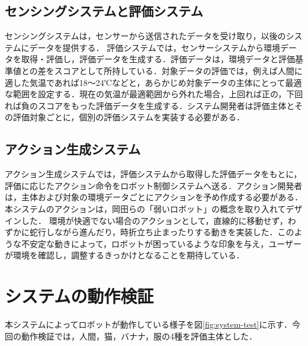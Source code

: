 \documentclass[paper=a4paper,jafontsize=9pt,head_space=15mm,gutter=20mm,
twocolumn,number_of_lines=49, line_length=26zw]{myuarticle}
\begin{document}
\subsection{センシングシステムと評価システム}
センシングシステムは，センサーから送信されたデータを受け取り，以後のシステムにデータを提供する．
評価システムでは，センサーシステムから環境データを取得・評価し，評価データを生成する．評価データは，環境データと評価基準値との差をスコアとして所持している．対象データの評価では，例えば人間に適した気温であれば18～24℃などと，あらかじめ対象データの主体にとって最適な範囲を設定する．現在の気温が最適範囲から外れた場合，上回れば正の，下回れば負のスコアをもった評価データを生成する．システム開発者は評価主体とその評価対象ごとに，個別の評価システムを実装する必要がある．

\subsection{アクション生成システム}
アクション生成システムでは，評価システムから取得した評価データをもとに，評価に応じたアクション命令をロボット制御システムへ送る．アクション開発者は，主体および対象の環境データごとにアクションを予め作成する必要がある．本システムのアクションは，岡田ら\cite{岡田-2017-弱いロボ}の「弱いロボット」の概念を取り入れてデザインした．
環境が快適でない場合のアクションとして，直線的に移動せず，わずかに蛇行しながら進んだり，時折立ち止まったりする動きを実装した．このような不安定な動きによって，ロボットが困っているような印象を与え，ユーザーが環境を確認し，調整するきっかけとなることを期待している．



\section{システムの動作検証}
本システムによってロボットが動作している様子を図\ref{fig:system-test}に示す．今回の動作検証では，人間，猫，バナナ，服の4種を評価主体とした．
\end{document}
